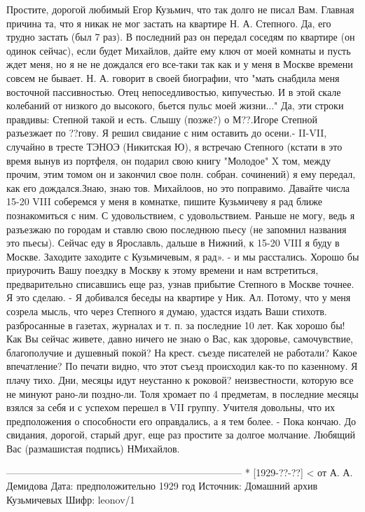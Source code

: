 \documentclass[]{memoir}
\begin{document}
Простите, дорогой любимый Егор Кузьмич, что так долго не писал Вам. Главная причина та, что я никак не мог застать на квартире Н. А. Степного.
Да, его трудно застать (был 7 раз). В последний раз он передал соседям по квартире (он одинок сейчас), если будет Михайлов, дайте ему ключ от моей комнаты и пусть ждет меня, но я не не дождался его все-таки так как и у меня в Москве времени совсем не бывает. Н. А. говорит в своей биографии, что "мать снабдила меня восточной пассивностью. Отец непоседливостью, кипучестью. И в этой скале колебаний от низкого до высокого, бьется пульс моей жизни..."
Да, эти строки правдивы: Степной такой и есть.
Слышу (позже?) о М??.Игоре Степной разъезжает по ??гову. Я решил свидание с ним оставить до осени.-
II-VII, случайно в тресте ТЭНОЭ (Никитская Ю), я встречаю Степного (кстати в это время вынув из портфеля, он подарил свою книгу "Молодое" X том, между прочим, этим томом он и закончил свое полн. собран. сочинений) я ему передал, как его дождался.Знаю, знаю тов. Михайлоов, но это поправимо.
Давайте числа 15-20 VIII соберемся у меня в комнатке, пишите Кузьмичеву я рад ближе познакомиться с ним.
С удовольствием, с удовольствием. Раньше не могу, ведь я разъезжаю по городам и ставлю свою последнюю пьесу (не запомнил названия это пьесы). Сейчас еду в Ярославль, дальше в Нижний, к 15-20 VIII я буду в Москве. Заходите заходите с Кузьмичевым, я рад». - и мы расстались.
Хорошо бы приурочить Вашу поездку в Москву к этому времени и нам встретиться, предварительно списавшись еще раз, узнав прибытие Степного в Москве точнее.  Я это сделаю. - Я добивался беседы на квартире у Ник. Ал. Потому, что у меня созрела мысль, что через Степного я думаю, удастся издать Ваши стихотв. разбросанные в газетах, журналах и т. п. за последние 10 лет. 
Как хорошо бы!
Как Вы сейчас живете, давно ничего не знаю о Вас, как здоровье, самочувствие, благополучие и душевный покой?
На крест. съезде писателей не работали? Какое впечатление? По печати видно, что этот съезд происходил как-то по казенному. Я плачу тихо. Дни, месяцы идут неустанно к роковой? неизвестности, которую все не минуют рано-ли поздно-ли.
Толя хромает по 4 предметам, в последние месяцы взялся за себя и с успехом перешел в VII группу. Учителя довольны, что их предположения о способности его оправдались, а я тем более. -  Пока кончаю.
До свидания, дорогой, старый друг, еще раз простите за долгое молчание.
Любящий Вас  (размашистая подпись) НМихайлов.

------------------------------------------------------------------------
* [1929-??-??] < от А. А. Демидова
Дата: предположительно 1929 год
Источник: Домашний архив Кузьмичевых
Шифр: leonov/1
\end{document}
